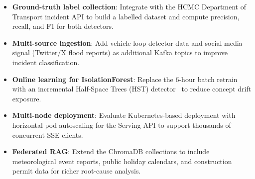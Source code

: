 \begin{itemize}
  \item \textbf{Ground-truth label collection}: Integrate with the HCMC
        Department of Transport incident API to build a labelled dataset and
        compute precision, recall, and F1 for both detectors.
  \item \textbf{Multi-source ingestion}: Add vehicle loop detector data and
        social media signal (Twitter/X flood reports) as additional Kafka
        topics to improve incident classification.
  \item \textbf{Online learning for IsolationForest}: Replace the 6-hour
        batch retrain with an incremental Half-Space Trees (HST)
        detector~\cite{tan2011hst} to reduce concept drift exposure.
  \item \textbf{Multi-node deployment}: Evaluate Kubernetes-based deployment
        with horizontal pod autoscaling for the Serving API to support
        thousands of concurrent SSE clients.
  \item \textbf{Federated RAG}: Extend the ChromaDB collections to include
        meteorological event reports, public holiday calendars, and
        construction permit data for richer root-cause analysis.
\end{itemize}
